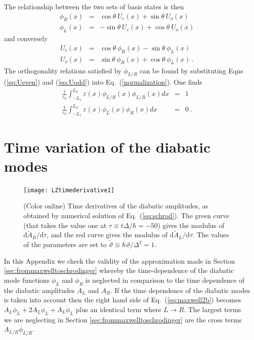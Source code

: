 \documentclass[twocolumn,english,pra,aps,superscriptaddress,floatfix]{revtex4-1}
\begin{document}
The relationship between the two sets of basis states is then
\begin{eqnarray}
\phi_{R}(x) & = & \cos\theta \ U_{e}(x) +\sin\theta \  U_{o}(x) \label{phi-L}
\\
\phi_{L}(x)  & = & -\sin\theta \ U_{e}(x) +\cos\theta \ U_{o}(x)
\label{phi-R}
\end{eqnarray}
and conversely
\begin{eqnarray}
U_{e}(x) & = & \cos\theta \ \phi_{R}(x) -\sin\theta \ \phi_{L}(x) \label{eq:Ueven}
\\
U_{o}(x) & = & \sin\theta \  \phi_{R}(x)  +\cos\theta \ \phi_{L}(x)  \ .
\label{eq:Uodd}
\end{eqnarray}
The orthogonality relations satisfied by $\phi_{L/R}$ can be found by substituting Eqns (\ref{eq:Ueven}) and (\ref{eq:Uodd}) into Eq.\ (\ref{normalization}). One finds
\begin{eqnarray}
\frac{1}{\varepsilon_{0}}\int_{-L_{1}}^{L_{2}}\varepsilon(x)\phi_{L/R}(x)\phi_{L/R}(x)dx & = & 1 \label{eq:normalizationphi1}\\
\frac{1}{\varepsilon_{0}}\int_{-L_{1}}^{L_{2}}\varepsilon(x)\phi_{L}(x)\phi_{R}(x)dx & = & 0 \label{eq:normalizationphi2} \ .
\end{eqnarray}

\section{Time variation of the diabatic modes}
\label{sec:appendix4}

\begin{figure}
\texttt{[image: LZtimederivative1]}
\caption{(Color online) Time derivatives of the diabatic amplitudes, as obtained by numerical solution of Eq.\ (\ref{eq:schrod}). The green curve (that takes the value one at $\tau \equiv t \Delta / \hbar =-50$) gives the modulus of $\mathrm{d} \tilde{A}_{R}/\mathrm{d} \tau $, and the red curve gives the modulus of  $\mathrm{d} \tilde{A}_{L}/\mathrm{d} \tau $. The values of the parameters are set to $\tilde{\vartheta} \equiv \hbar \vartheta / \Delta^2=1$.}
\label{fig:LZtimederivative}
\end{figure}


In this Appendix we check the validity of the approximation made in Section \ref{sec:frommaxwelltoschrodinger} whereby  the time-dependence of the diabatic mode functions $\phi_{L}$ and $\phi_{R}$ is neglected in comparison to the time dependence of the diabatic amplitudes $A_{L}$ and $A_{R}$. If the time dependence of the diabatic modes is taken into account then the right hand side of Eq.\ (\ref{eq:maxwell2b}) becomes $\ddot{A}_{L}\phi_{L}+2\dot{A}_{L}\dot{\phi}_{L}+A_{L}\ddot{\phi}_{L}$ plus an identical term where $L \rightarrow R$. The largest terms we are neglecting in Section \ref{sec:frommaxwelltoschrodinger} are the cross terms $\dot{A}_{L/R}\dot{\phi}_{L/R}$. 
\end{document}
